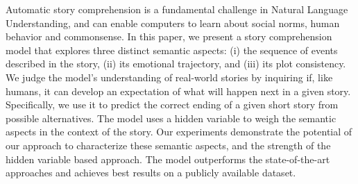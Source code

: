 Automatic story comprehension is a fundamental challenge in Natural Language Understanding, and can enable computers to learn about social norms, human behavior and commonsense. In this paper, we present a story comprehension model that explores three distinct semantic aspects: (i) the sequence of events described in the story, (ii) its emotional trajectory, and (iii) its plot consistency. We judge the model's understanding of real-world stories by inquiring if, like humans, it can develop an expectation of what will happen next in a given story. Specifically, we use it to predict the correct ending of a given short story from possible alternatives. The model uses a hidden variable to weigh the semantic aspects in the context of the story. Our experiments demonstrate the potential of our approach to characterize these semantic aspects, and the strength of the hidden variable based approach. The model outperforms the state-of-the-art approaches and achieves best results on a publicly available dataset.
